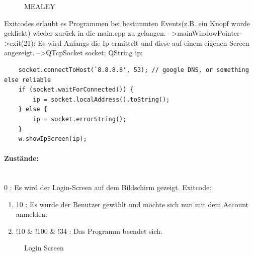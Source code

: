 \documentclass[11pt,a4paper]{article} %
\begin{document}
	\begin{figure}[h]
	\caption{MEALEY}
	\end{figure}
	
	Exitcodes erlaubt es Programmen bei bestimmten Events(z.B. ein Knopf wurde geklickt) wieder zurück in die main.cpp zu gelangen.
	 -->mainWindowPointer->exit(21); 
	Es wird Anfangs die Ip ermittelt und diese auf einem eigenen Screen angezeigt.
	-->QTcpSocket socket;
    QString ip;
\begin{frame}

\begin{lstlisting}
    socket.connectToHost(`8.8.8.8', 53); // google DNS, or something else reliable
    if (socket.waitForConnected()) {
        ip = socket.localAddress().toString();
    } else {
        ip = socket.errorString();
    }
    w.showIpScreen(ip);
\end{lstlisting}
\end{frame}
\par
\paragraph{Zustände:} $\;$ \\
		0 : Es wird der Login-Screen auf dem Bildschirm gezeigt.
			Exitcode: 
\begin{enumerate}
			\item	10 : Es wurde der Benutzer gewählt und möchte sich nun mit dem Account anmelden.
			\item	!10 \& !100 \& !34 : Das Programm beendet sich.
\end{enumerate}
\begin{figure}[h]
	\caption{Login Screen}
	\end{figure}
	
\end{document}
